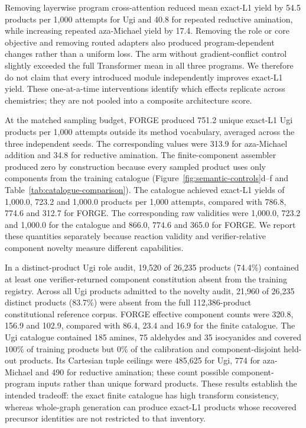 \documentclass{article}
\newcommand{\ForgeNovelAgainstFullCount}{21{,}960}
\newcommand{\ForgeNovelAgainstFullDenominator}{26{,}235}
\newcommand{\ForgeNovelAgainstFullPercent}{83.7}
\newcommand{\ForgeOffRegistryCount}{19{,}520}
\newcommand{\ForgeOffRegistryDenominator}{26{,}235}
\newcommand{\ForgeOffRegistryPercent}{74.4}
\begin{document}
Removing layerwise program cross-attention reduced mean exact-L1 yield by 54.5 products per 1,000
attempts for Ugi and 40.8 for repeated reductive amination, while increasing repeated aza-Michael
yield by 17.4. Removing the role or core objective and removing routed adapters also produced
program-dependent changes rather than a uniform loss. The arm without gradient-conflict control
slightly exceeded the full Transformer mean in all three programs. We therefore do not claim that
every introduced module independently improves exact-L1 yield. These one-at-a-time interventions
identify which effects replicate across chemistries; they are not pooled into a composite
architecture score.

At the matched sampling budget, FORGE produced 751.2 unique exact-L1 Ugi products per 1,000 attempts
outside its method vocabulary, averaged across the three independent seeds. The corresponding
values were 313.9 for aza-Michael addition and 34.8 for reductive amination. The finite-component
assembler produced zero by construction because every sampled product uses only components from
the training catalogue
(Figure~\ref{fig:semantic-controls}d--f and Table~\ref{tab:catalogue-comparison}).
The catalogue achieved exact-L1 yields of 1,000.0, 723.2 and 1,000.0 products per 1,000 attempts,
compared with 786.8, 774.6 and 312.7 for FORGE. The corresponding raw validities were 1,000.0,
723.2 and 1,000.0 for the catalogue and 866.0, 774.6 and 365.0 for FORGE.
We report these quantities separately because reaction validity and verifier-relative component
novelty measure different capabilities.

In a distinct-product Ugi role audit, \ForgeOffRegistryCount{} of
\ForgeOffRegistryDenominator{} products (\ForgeOffRegistryPercent\%) contained at least one
verifier-returned component constitution absent from the training registry. Across all Ugi products
admitted to the novelty audit, \ForgeNovelAgainstFullCount{} of
\ForgeNovelAgainstFullDenominator{} distinct products (\ForgeNovelAgainstFullPercent\%) were absent
from the full 112,386-product constitutional reference corpus. FORGE effective component counts were
320.8, 156.9 and 102.9, compared with 86.4, 23.4 and 16.9 for the finite catalogue. The Ugi catalogue
contained 185 amines, 75 aldehydes and 35 isocyanides and covered $100\%$ of training products but
$0\%$ of the calibration and component-disjoint held-out products. Its Cartesian tuple ceilings were
485,625 for Ugi, 774 for aza-Michael and 490 for reductive amination; these count possible
component-program inputs rather than unique forward products. These results establish the intended
tradeoff: the exact finite catalogue has high transform consistency, whereas whole-graph generation
can produce exact-L1 products whose recovered precursor identities are not restricted to that
inventory.
\end{document}
